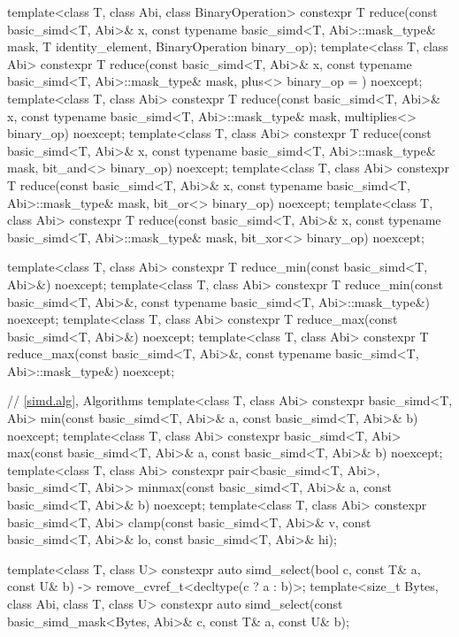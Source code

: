 \begin{codeblock}
{  template<class T, class Abi, class BinaryOperation>
    constexpr T reduce(const basic_simd<T, Abi>& x, const typename basic_simd<T, Abi>::mask_type& mask,
                       T identity_element, BinaryOperation binary_op);
  template<class T, class Abi>
    constexpr T reduce(const basic_simd<T, Abi>& x, const typename basic_simd<T, Abi>::mask_type& mask,
                       plus<> binary_op = {}) noexcept;
  template<class T, class Abi>
    constexpr T reduce(const basic_simd<T, Abi>& x, const typename basic_simd<T, Abi>::mask_type& mask,
                       multiplies<> binary_op) noexcept;
  template<class T, class Abi>
    constexpr T reduce(const basic_simd<T, Abi>& x, const typename basic_simd<T, Abi>::mask_type& mask,
                       bit_and<> binary_op) noexcept;
  template<class T, class Abi>
    constexpr T reduce(const basic_simd<T, Abi>& x, const typename basic_simd<T, Abi>::mask_type& mask,
                       bit_or<> binary_op) noexcept;
  template<class T, class Abi>
    constexpr T reduce(const basic_simd<T, Abi>& x, const typename basic_simd<T, Abi>::mask_type& mask,
                       bit_xor<> binary_op) noexcept;

  template<class T, class Abi>
    constexpr T reduce_min(const basic_simd<T, Abi>&) noexcept;
  template<class T, class Abi>
    constexpr T reduce_min(const basic_simd<T, Abi>&, const typename basic_simd<T, Abi>::mask_type&) noexcept;
  template<class T, class Abi>
    constexpr T reduce_max(const basic_simd<T, Abi>&) noexcept;
  template<class T, class Abi>
    constexpr T reduce_max(const basic_simd<T, Abi>&, const typename basic_simd<T, Abi>::mask_type&) noexcept;

  // \ref{simd.alg}, Algorithms
  template<class T, class Abi>
    constexpr basic_simd<T, Abi>
      min(const basic_simd<T, Abi>& a, const basic_simd<T, Abi>& b) noexcept;
  template<class T, class Abi>
    constexpr basic_simd<T, Abi>
      max(const basic_simd<T, Abi>& a, const basic_simd<T, Abi>& b) noexcept;
  template<class T, class Abi>
    constexpr pair<basic_simd<T, Abi>, basic_simd<T, Abi>>
      minmax(const basic_simd<T, Abi>& a, const basic_simd<T, Abi>& b) noexcept;
  template<class T, class Abi>
    constexpr basic_simd<T, Abi>
      clamp(const basic_simd<T, Abi>& v,
            const basic_simd<T, Abi>& lo,
            const basic_simd<T, Abi>& hi);

  template<class T, class U>
    constexpr auto simd_select(bool c, const T& a, const U& b) -> remove_cvref_t<decltype(c ? a : b)>;
  template<size_t Bytes, class Abi, class T, class U>
    constexpr auto simd_select(const basic_simd_mask<Bytes, Abi>& c, const T& a, const U& b);
}
\end{codeblock}

